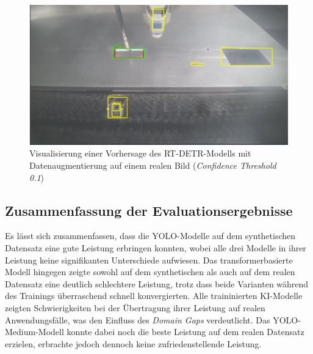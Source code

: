 \begin{figure}[htb]
      \centering                        
      \includegraphics[width=0.9\linewidth]{graphics/example_synthetic_images/Beispiel_Detektion_rtdetr.jpg}
      \caption{Visualisierung einer Vorhersage des \ac{RT-DETR}-Modells mit Datenaugmentierung auf einem realen Bild (\textit{Confidence Threshold 0.1})}
      \label{fig:beispiel_vorhersage_rtdetr}
\end{figure}

\subsection{Zusammenfassung der Evaluationsergebnisse}
Es lässt sich zusammenfassen, dass die \ac{YOLO}-Modelle auf dem synthetischen Datensatz eine gute Leistung erbringen konnten, wobei alle drei Modelle in ihrer Leistung keine signifikanten Unterschiede aufwiesen. Das transformerbasierte Modell hingegen zeigte sowohl auf dem synthetischen als auch auf dem realen Datensatz eine deutlich schlechtere Leistung, trotz dass beide Varianten während des Trainings überraschend schnell konvergierten. Alle traininierten \ac{KI}-Modelle zeigten Schwierigkeiten bei der Übertragung ihrer Leistung auf realen Anwendungsfälle, was den Einfluss des \textit{Domain Gaps} verdeutlicht. Das \ac{YOLO}-Medium-Modell konnte dabei noch die beste Leistung auf dem realen Datensatz erzielen, erbrachte jedoch dennoch keine zufriedenstellende Leistung.
